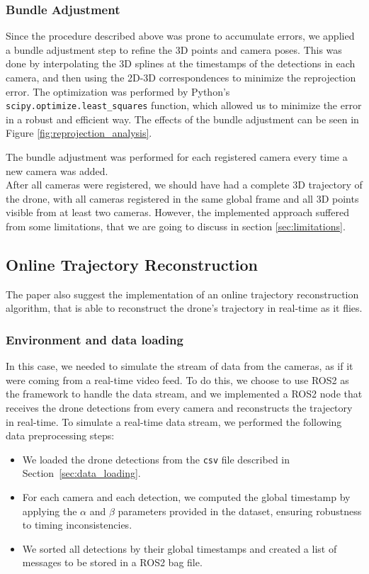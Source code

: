 \documentclass[11pt]{article}
\begin{document}
\subsubsection{Bundle Adjustment}

Since the procedure described above was prone to accumulate errors, we applied a bundle adjustment step to refine the 3D points and camera poses. This was done by interpolating the 3D splines at the timestamps of the detections in each camera, and then using the 2D-3D correspondences to minimize the reprojection error. The optimization was performed by Python's \texttt{scipy.optimize.least\_squares} function, which allowed us to minimize the error in a robust and efficient way. The effects of the bundle adjustment can be seen in Figure \ref{fig:reprojection_analysis}.

The bundle adjustment was performed for each registered camera every time a new camera was added.\\

After all cameras were registered, we should have had a complete 3D trajectory of the drone, with all cameras registered in the same global frame and all 3D points visible from at least two cameras. However, the implemented approach suffered from some limitations, that we are going to discuss in section \ref{sec:limitations}.

\subsection{Online Trajectory Reconstruction}

The paper also suggest the implementation of an online trajectory reconstruction algorithm, that is able to reconstruct the drone's trajectory in real-time as it flies.

\subsubsection{Environment and data loading}

In this case, we needed to simulate the stream of data from the cameras, as if it were coming from a real-time video feed. To do this, we choose to use ROS2 as the framework to handle the data stream, and we implemented a ROS2 node that receives the drone detections from every camera and reconstructs the trajectory in real-time.
To simulate a real-time data stream, we performed the following data preprocessing steps:
\begin{itemize}
    \item We loaded the drone detections from the \texttt{csv} file described in Section~\ref{sec:data_loading}.
    \item For each camera and each detection, we computed the global timestamp by applying the $\alpha$ and $\beta$ parameters provided in the dataset, ensuring robustness to timing inconsistencies.
    \item We sorted all detections by their global timestamps and created a list of messages to be stored in a ROS2 bag file.
\end{itemize}
\end{document}
